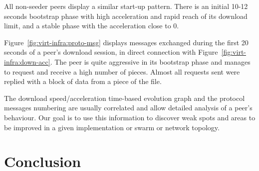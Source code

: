 All non-seeder peers display a similar start-up pattern. There is an initial
10-12 seconds bootstrap phase with high acceleration and rapid reach of its
download limit, and a stable phase with the acceleration close to 0.

Figure~\ref{fig:virt-infra:proto-msg} displays messages exchanged during the
first 20 seconds of a peer's download session, in direct connection with
Figure~\ref{fig:virt-infra:down-acc}. The peer is quite aggressive in its
bootstrap phase and manages to request and receive a high number of pieces.
Almost all requests sent were replied with a block of data from a piece of the
file.

The download speed/acceleration time-based evolution graph and the protocol
messages numbering are usually correlated and allow detailed analysis of a
peer's behaviour. Our goal is to use this information to discover weak spots
and areas to be improved in a given implementation or swarm or network
topology.

\section{Conclusion}
\label{sec:virt-infra:conclusion}


